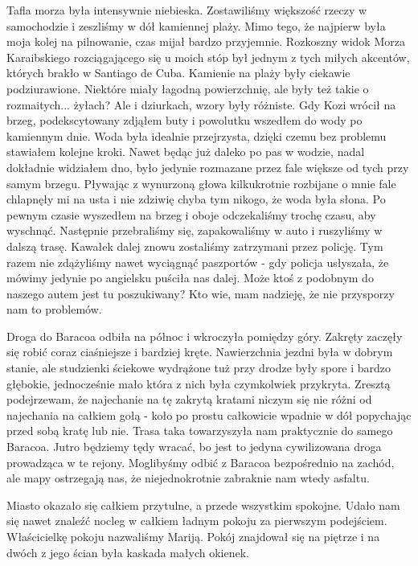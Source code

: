 \noindent Tafla morza była intensywnie niebieska.
Zostawiliśmy większość rzeczy w samochodzie i zeszliśmy w dół kamiennej plaży. 
Mimo tego, że najpierw była moja kolej na pilnowanie, czas mijał bardzo przyjemnie.
Rozkoszny widok Morza Karaibskiego rozciągającego się u moich stóp był jednym z tych miłych akcentów, których brakło w Santiago de Cuba.
Kamienie na plaży były ciekawie podziurawione.
Niektóre miały łagodną powierzchnię, ale były też takie o rozmaitych...
żyłach?
Ale i dziurkach, wzory były różniste.
Gdy Kozi wrócił na brzeg, podekscytowany zdjąłem buty i powolutku wszedłem do wody po kamiennym dnie.
Woda była idealnie przejrzysta, dzięki czemu bez problemu stawiałem kolejne kroki.
Nawet będąc już daleko po pas w wodzie, nadal dokładnie widziałem dno, było jedynie rozmazane przez fale większe od tych przy samym brzegu.
Pływając z wynurzoną głowa kilkukrotnie rozbijane o mnie fale chlapnęły mi na usta i nie zdziwię chyba tym nikogo, że woda była słona.
Po pewnym czasie wyszedłem na brzeg i oboje odczekaliśmy trochę czasu, aby wyschnąć.
Następnie przebraliśmy się, zapakowaliśmy w auto i ruszyliśmy w dalszą trasę.
Kawałek dalej znowu zostaliśmy zatrzymani przez policję.
Tym razem nie zdążyliśmy nawet wyciągnąć paszportów - gdy policja usłyszała, że mówimy jedynie po angielsku puściła nas dalej.
Może ktoś z podobnym do naszego autem jest tu poszukiwany?
Kto wie, mam nadzieję, że nie przysporzy nam to problemów.
\par Droga do Baracoa odbiła na północ i wkroczyła pomiędzy góry.
Zakręty zaczęły się robić coraz ciaśniejsze i bardziej kręte.
Nawierzchnia jezdni była w dobrym stanie, ale studzienki ściekowe wydrążone tuż przy drodze były spore i bardzo głębokie, jednocześnie mało która z nich była czymkolwiek przykryta.
Zresztą podejrzewam, że najechanie na tę zakrytą kratami niczym się nie różni od najechania na całkiem gołą - koło po prostu całkowicie wpadnie w dół popychając przed sobą kratę lub nie.
Trasa taka towarzyszyła nam praktycznie do samego Baracoa.
Jutro będziemy tędy wracać, bo jest to jedyna cywilizowana droga prowadząca w te rejony.
Moglibyśmy odbić z Baracoa bezpośrednio na zachód, ale mapy ostrzegają nas, że niejednokrotnie zabraknie nam wtedy asfaltu.
\par Miasto okazało się całkiem przytulne, a przede wszystkim spokojne.
Udało nam się nawet znaleźć nocleg w całkiem ładnym pokoju za pierwszym podejściem.
Właścicielkę pokoju nazwaliśmy Mariją.
Pokój znajdował się na piętrze i na dwóch z jego ścian była kaskada małych okienek.
